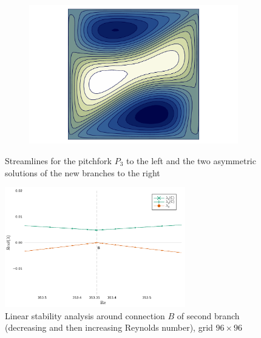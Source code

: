 \begin{figure}[h!]
\begin{subfigure}[b]{0.33\textwidth}
\end{subfigure}
\begin{subfigure}[b]{0.33\textwidth}
  \centering
  \includegraphics[trim={2cm 0 2cm 0},clip,width=\textwidth]{figs/psi_Re375.000_branch2_u_t_bigger.pdf}
\end{subfigure}
\caption{Streamlines for the pitchfork $P_3$ to the left and the two asymmetric
  solutions of the new branches to the right}
\label{fig:sol_branch2}
\end{figure}

\begin{figure}[h!]
  \centering
  \includegraphics[width=0.7\textwidth]{figs/lsa_branch2_96x96.pdf}
  \caption{Linear stability analysis around connection $B$ of second branch
  (decreasing and then increasing Reynolds number), grid $96 \times 96$}
  \label{fig:lsa_branch2}
\end{figure}

